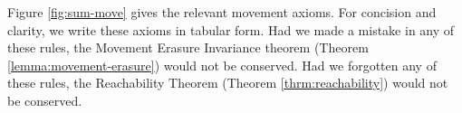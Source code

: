 Figure \ref{fig:sum-move} gives the relevant movement axioms. For concision
and clarity, we write these axioms in tabular form. Had we made a mistake
in any of these rules, the Movement Erasure Invariance theorem
(Theorem \ref{lemma:movement-erasure}) would not be conserved. Had we
forgotten any of these rules, the Reachability Theorem
(Theorem \ref{thrm:reachability}) would not be conserved.

\iffalse
\begin{displaymath}
\begin{array}{@{}r@{~}l@{~~~}c@{~~~}ll@{~~}}
  \multicolumn{5}{l}{\textbf{Type Construction Actions for Sum Type}:}
  \\
  \TABperformTyp{\zwsel{\hehole}}{\aConstructx{\fsum}}
  {\tsum{\zwsel{\hehole}}{\hehole}}
  \\[3mm]
  \multicolumn{5}{l}{\textbf{Analytical Construction Actions for Sum Type}:}
  \\
  \TABperformAna{\hGamma}{\zwsel{\hehole}}
              {\tsum{\hehole}{\hehole}}
              {\aConstructx{\finj{i}}}
              {\hinj{i}{\zwsel{\hehole}}}
  \\
  \TABperformAna{\hGamma}{\zwsel{\hehole}}
              {\htau, \tincompat{\htau}{ \tsum{\hehole}{\hehole} }}
              {\aConstructx{\finj{i}}}
              {\hhole{\hinj{i}{\zwsel{\hehole}}}}
  \\
  \TABperformAna{\hGamma}{\zwsel{\hehole}}
              {\htau}
              {\aConstructx{\fcase{x}{y}}}
              {\hcase{\zwsel{\hehole}}{x}{\hehole}{y}{\hehole}}
\end{array}
\end{displaymath}
\fi
